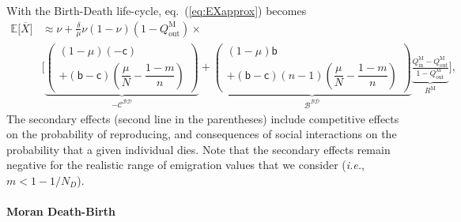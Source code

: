 \documentclass[11pt, letterpaper]{article}
\renewcommand{\eqref}[1]{\textup{{\normalfont eq.~(\ref{#1}}\normalfont)}}
\newcommand{\ie}{\textit{i.e.}}
\newcommand{\Esp}[1]{\mathbb{E}\big[ #1\big]}%
\newcommand{\bb}{\mathsf{b}}
\newcommand{\cc}{\mathsf{c}}
\newcommand{\Moran}{\textrm{M}}
\newcommand{\BD}{\textrm{BD}}
\newcommand{\mutbias}{\nu}
\newcommand{\inn}{\textrm{in}}
\newcommand{\out}{\textrm{out}}
\newcommand{\ndemes}{N_D}
\newcommand{\selstr}{\delta}
\begin{document}
With the Birth-Death life-cycle, \eqref{eq:EXapprox} becomes
%
\begin{equation}\label{eq:EXBD}
\begin{split}
\Esp{\overline{X}} & \approx \mutbias + 
\frac{\selstr}{\mu}  \mutbias (1-\mutbias) (1 - Q_{\out}^{\Moran}) \times \\
 &\Bigg[ \underbrace{ \begin{pmatrix}
 (1-\mu) (-\cc) \\
 + (\bb - \cc) \left( \dfrac{\mu}{N} - \dfrac{1-m}{n} \right) 
 \end{pmatrix}
}_{-\mathcal{C^{\BD}}} + \underbrace{ \begin{pmatrix}
(1-\mu) \bb \\
+ (\bb - \cc) (n-1) \left(  \dfrac{\mu}{N} - \dfrac{1-m}{n} \right) 
\end{pmatrix}
}_{\mathcal{B^{\BD}}} \underbrace{\frac{Q_{\inn}^{\Moran} - Q_{\out}^{\Moran}}{1 - Q_{\out}^{\Moran}}}_{R^{\Moran}} \Bigg],
\end{split}
\end{equation}
%
The secondary effects (second line in the parentheses) include competitive effects on the probability of reproducing, and consequences of social interactions on the probability that a given individual dies. Note that the secondary effects remain negative for the realistic range of emigration values that we consider (\ie, $m<1 - 1/\ndemes$).


\paragraph{Moran Death-Birth}
\end{document}
